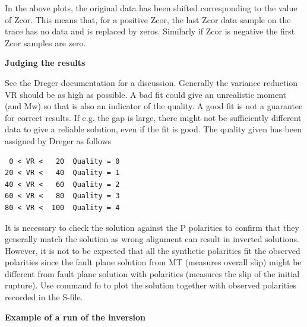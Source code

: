 In the above plots, the original data has been shifted corresponding to the value of Zcor. This means that, for a positive Zcor, the last Zcor data sample on the trace has no data and is replaced by zeros. Similarly if Zcor is negative the first Zcor samples are zero.

\textbf{Judging the results}

See the Dreger documentation for a discussion. Generally the variance reduction VR should be as high as possible.  A bad fit could give an unrealistic moment (and Mw) so that is also an indicator of the quality. 
A good fit is not a guarantee for correct results. If e.g. the gap is large, there might not be sufficiently different data to give a reliable solution, even if the fit is good. The quality given has been assigned by Dreger as follows

\begin{verbatim}
 0 < VR <   20  Quality = 0
20 < VR <   40  Quality = 1
40 < VR <   60  Quality = 2
60 < VR <   80  Quality = 3
80 < VR <  100  Quality = 4
\end{verbatim}

It is necessary to check the solution against the P polarities to confirm that they generally match the solution as wrong alignment can result in inverted solutions. However, it is not to be expected that all the synthetic polarities fit the observed polarities since the fault plane solution from MT (measures overall slip) might be different from fault plane solution with polarities (measures the slip of the initial rupture). Use command fo to plot the solution together with observed polarities recorded in the S-file. 

\textbf{Example of a run of the inversion}



